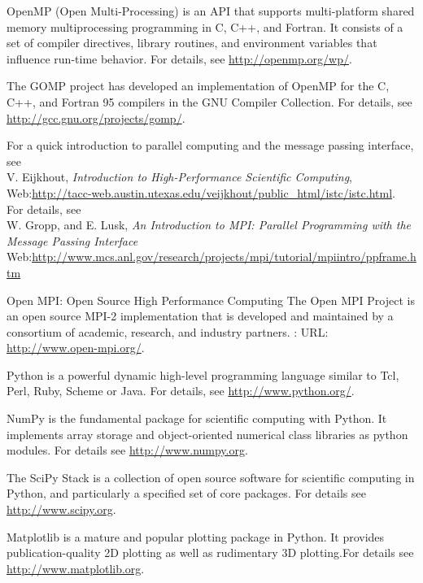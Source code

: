 \documentclass[a4paper,10pt]{article}
\begin{document}
\begin{thebibliography}{10}
OpenMP (Open Multi-Processing) is an API that supports multi-platform shared memory multiprocessing programming in C, C++, and Fortran. It consists of a set of compiler directives, library routines, and environment variables that influence run-time behavior. For details, see \url{http://openmp.org/wp/}.

The GOMP project has developed an implementation of OpenMP for the C, C++, and Fortran 95 compilers in the GNU Compiler Collection. For details, see \url{http://gcc.gnu.org/projects/gomp/}.

\newblock For a quick introduction to parallel computing and the message passing interface, see \\
\newblock V. Eijkhout,
{\em Introduction to High-Performance Scientific Computing},
\newblock Web:\url{http://tacc-web.austin.utexas.edu/veijkhout/public_html/istc/istc.html}.\\
For details, see \\
\newblock W. Gropp, and E. Lusk,
{\em An Introduction to MPI: Parallel Programming with the Message Passing Interface}\\
\newblock Web:\url{http://www.mcs.anl.gov/research/projects/mpi/tutorial/mpiintro/ppframe.htm}

\newblock Open MPI: Open Source High Performance Computing
\newblock The Open MPI Project is an open source MPI-2 implementation that is developed and maintained by a consortium of academic, research, and industry partners.
\newblock: URL: \url{http://www.open-mpi.org/}.

Python is a powerful dynamic high-level programming language similar to Tcl, Perl, Ruby, Scheme or Java. For details, see \url{http://www.python.org/}.

NumPy is the fundamental package for scientific computing with Python. It implements array storage and object-oriented numerical class libraries as python modules. For details see \url{http://www.numpy.org}.

The SciPy Stack is a collection of open source software for scientific computing in Python, and particularly a specified set of core packages. For details see \url{http://www.scipy.org}.

Matplotlib is a mature and popular plotting package in Python. It provides publication-quality 2D plotting as well as rudimentary 3D plotting.For details see \url{http://www.matplotlib.org}.


\end{thebibliography}
\end{document}
